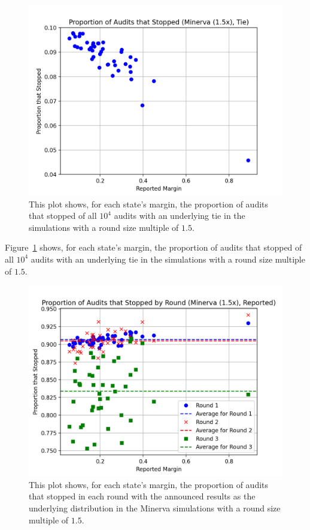 \documentclass[runningheads]{llncs}
\begin{document}

\begin{figure}
\includegraphics[width=\textwidth]{minerva_multiround_1p5x_10^4/total_risk.png}
\caption{This plot shows, for each state's margin, the proportion of audits that stopped of
all $10^4$ audits with an underlying tie in the simulations with a round size multiple of $1.5$.}
\label{fig:minerva1p5_risk}
\end{figure}

Figure~\ref{fig:minerva1p5_risk} shows, for each state's margin, the proportion of audits that stopped of
all $10^4$ audits with an underlying tie in the simulations with a round size multiple of $1.5$.

\begin{figure}
\includegraphics[width=\textwidth]{minerva_multiround_1p5x_10^4/sprobs_first_three.png}
\caption{This plot shows, for each state's margin, the proportion of audits that stopped in each round
with the announced results as the underlying distribution
in the Minerva simulations with a round size multiple of $1.5$.}
\label{fig:minerva1p5_sprob}
\end{figure}
\end{document}

